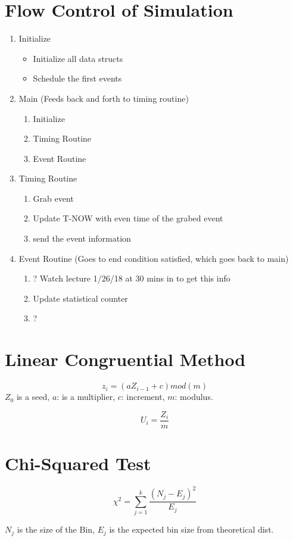 \documentclass[12pt]{article}
\begin{document}
\section*{Flow Control of Simulation}

\begin{enumerate}
\item Initialize
\begin{itemize}
\item Initialize all data structs
\item Schedule the first events
\end{itemize}
\item Main (Feeds back and forth to timing routine)
\begin{enumerate}
\item Initialize
\item Timing Routine
\item Event Routine
\end{enumerate}
\item Timing Routine
\begin{enumerate}
\item Grab event
\item Update T-NOW with even time of the grabed event
\item send the event information
\end{enumerate}
\item Event Routine (Goes to end condition satisfied, which goes back to main)
\begin{enumerate}
\item ? Watch lecture 1/26/18 at 30 mins in to get this info
\item Update statistical counter 
\item ?
\end{enumerate}
\end{enumerate}

\section*{Linear Congruential Method}
$$z_i=(aZ_{i-1}+c)mod(m)$$
$Z_0$ is a seed, $a$: is a multiplier, $c$: increment, $m$: modulus. 

$$U_i=\frac{Z_i}{m}$$

\section*{Chi-Squared Test}
$${\chi}^2=\sum_{j=1}^k \frac{(N_j-E_j)^2}{E_j}$$

$N_j$ is the size of the Bin, $E_j$ is the expected bin size from theoretical dist. 
\end{document}
